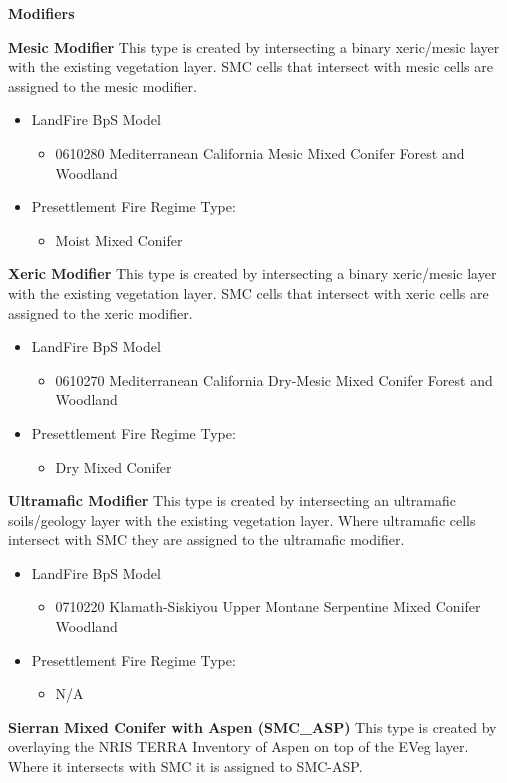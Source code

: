 \noindent \textbf{Modifiers} \\
\begin{adjustwidth}{2cm}{}
\noindent \textbf{Mesic Modifier } This type is created by intersecting a binary xeric/mesic layer with the existing vegetation layer. SMC cells that intersect with mesic cells are assigned to the mesic modifier.
\begin{itemize}
	\item LandFire BpS Model
	\begin{itemize}
		\item 0610280 Mediterranean California Mesic Mixed Conifer Forest and Woodland
	\end{itemize}
		\item Presettlement Fire Regime Type: 
	\begin{itemize}
		\item Moist Mixed Conifer
	\end{itemize}
\end{itemize}

\noindent \textbf{Xeric Modifier} This type is created by intersecting a binary xeric/mesic layer with the existing vegetation layer. SMC cells that intersect with xeric cells are assigned to the xeric modifier.
\begin{itemize}
	\item LandFire BpS Model
	\begin{itemize}
		\item 0610270 Mediterranean California Dry-Mesic Mixed Conifer Forest and Woodland
	\end{itemize}
		\item Presettlement Fire Regime Type: 
	\begin{itemize}
		\item Dry Mixed Conifer
	\end{itemize}
\end{itemize}

\noindent \textbf{Ultramafic Modifier} This type is created by intersecting an ultramafic soils/geology layer with the existing vegetation layer. Where ultramafic cells intersect with SMC they are assigned to the ultramafic modifier.
\begin{itemize}
	\item LandFire BpS Model
	\begin{itemize}
		\item 0710220 Klamath-Siskiyou Upper Montane Serpentine Mixed Conifer Woodland
	\end{itemize}
	\item Presettlement Fire Regime Type: 
	\begin{itemize}
		\item N/A
	\end{itemize}
\end{itemize}

\noindent \textbf{Sierran Mixed Conifer with Aspen (SMC\_ASP)} This type is created by overlaying the NRIS TERRA Inventory of Aspen on top of the EVeg layer. Where it intersects with SMC it is assigned to SMC-ASP. \\

\end{adjustwidth}

